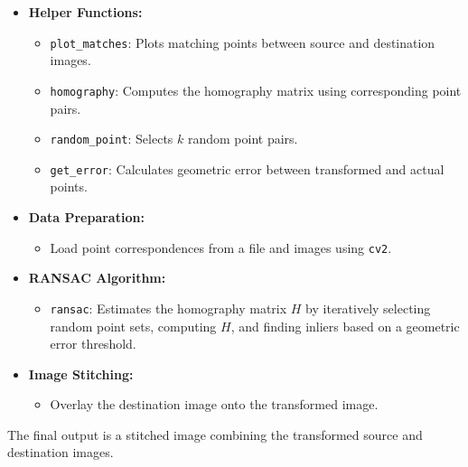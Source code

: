 \documentclass{article}
\begin{document}
\begin{itemize}

    \item \textbf{Helper Functions:}
    \begin{itemize}
        \item \texttt{plot\_matches}: Plots matching points between source and destination images.
        \item \texttt{homography}: Computes the homography matrix using corresponding point pairs.
        \item \texttt{random\_point}: Selects $k$ random point pairs.
        \item \texttt{get\_error}: Calculates geometric error between transformed and actual points.
    \end{itemize}

    \item \textbf{Data Preparation:}
    \begin{itemize}
        \item Load point correspondences from a file and images using \texttt{cv2}.
    \end{itemize}

    \item \textbf{RANSAC Algorithm:}
    \begin{itemize}
        \item \texttt{ransac}: Estimates the homography matrix $H$ by iteratively selecting random point sets, computing $H$, and finding inliers based on a geometric error threshold.
    \end{itemize}

    \item \textbf{Image Stitching:}
    \begin{itemize}
        \item Overlay the destination image onto the transformed image.
    \end{itemize}
\end{itemize}

The final output is a stitched image combining the transformed source and destination images.
\end{document}
